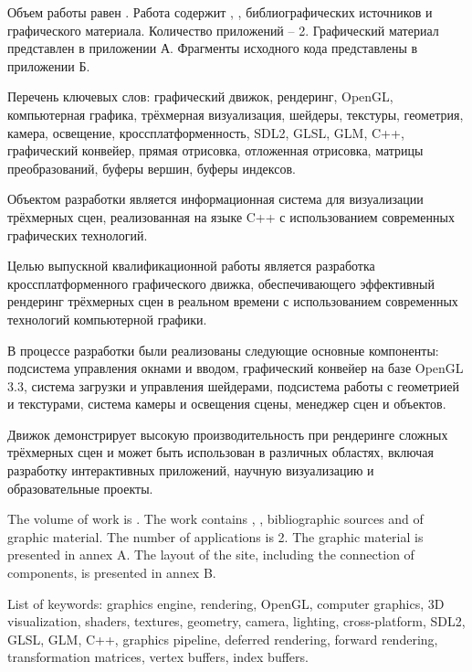 
Объем работы равен . Работа содержит , ,  библиографических источников и  графического материала. Количество приложений – 2. Графический материал представлен в приложении А. Фрагменты исходного кода представлены в приложении Б.

Перечень ключевых слов: графический движок, рендеринг, OpenGL, компьютерная графика, трёхмерная визуализация, шейдеры, текстуры, геометрия, камера, освещение, кроссплатформенность, SDL2, GLSL, GLM, C++, графический конвейер, прямая отрисовка, отложенная отрисовка, матрицы преобразований, буферы вершин, буферы индексов.

Объектом разработки является информационная система для визуализации трёхмерных сцен, реализованная на языке C++ с использованием современных графических технологий.

Целью выпускной квалификационной работы является разработка кроссплатформенного графического движка, обеспечивающего эффективный рендеринг трёхмерных сцен в реальном времени с использованием современных технологий компьютерной графики.

В процессе разработки были реализованы следующие основные компоненты: подсистема управления окнами и вводом, графический конвейер на базе OpenGL 3.3, система загрузки и управления шейдерами, подсистема работы с геометрией и текстурами, система камеры и освещения сцены, менеджер сцен и объектов.

Движок демонстрирует высокую производительность при рендеринге сложных трёхмерных сцен и может быть использован в различных областях, включая разработку интерактивных приложений, научную визуализацию и образовательные проекты.

  
The volume of work is . The work contains , ,  bibliographic sources and  of graphic material. The number of applications is 2. The graphic material is presented in annex A. The layout of the site, including the connection of components, is presented in annex B.

List of keywords: graphics engine, rendering, OpenGL, computer graphics, 3D visualization, shaders, textures, geometry, camera, lighting, cross-platform, SDL2, GLSL, GLM, C++, graphics pipeline, deferred rendering, forward rendering, transformation matrices, vertex buffers, index buffers.


